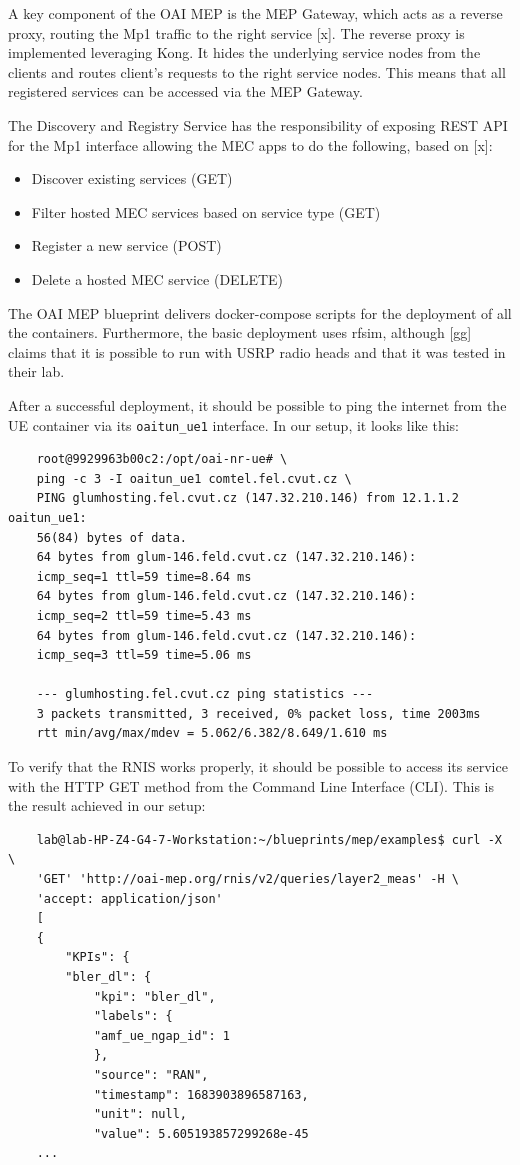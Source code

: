 \documentclass[12pt,a4paper,twoside]{report}
\begin{document}
A key component of the OAI MEP is the MEP Gateway, which acts as a reverse proxy, routing the Mp1 traffic to the right service [x]. The reverse proxy is implemented leveraging Kong. It hides the underlying service nodes from the clients and routes client’s requests to the right service nodes. This means that all registered services can be accessed via the MEP Gateway. 

The Discovery and Registry Service has the responsibility of exposing REST API for the Mp1 interface allowing the MEC apps to do the following, based on [x]:
\begin{itemize}
	\item Discover existing services (GET)
	\item Filter hosted MEC services based on service type (GET)
	\item Register a new service (POST)
	\item Delete a hosted MEC service (DELETE)
\end{itemize}
The OAI MEP blueprint delivers docker-compose scripts for the deployment of all the containers. Furthermore, the basic deployment uses rfsim, although [gg] claims that it is possible to run with USRP radio heads and that it was tested in their lab. 

After a successful deployment, it should be possible to ping the internet from the UE container via its \verb |oaitun_ue1| interface. In our setup, it looks like this:
\begin{verbatim}
	root@9929963b00c2:/opt/oai-nr-ue# \
	ping -c 3 -I oaitun_ue1 comtel.fel.cvut.cz \
	PING glumhosting.fel.cvut.cz (147.32.210.146) from 12.1.1.2 oaitun_ue1:
	56(84) bytes of data.
	64 bytes from glum-146.feld.cvut.cz (147.32.210.146):
	icmp_seq=1 ttl=59 time=8.64 ms
	64 bytes from glum-146.feld.cvut.cz (147.32.210.146):
	icmp_seq=2 ttl=59 time=5.43 ms
	64 bytes from glum-146.feld.cvut.cz (147.32.210.146):
	icmp_seq=3 ttl=59 time=5.06 ms

	--- glumhosting.fel.cvut.cz ping statistics ---
	3 packets transmitted, 3 received, 0% packet loss, time 2003ms
	rtt min/avg/max/mdev = 5.062/6.382/8.649/1.610 ms
\end{verbatim}

To verify that the RNIS works properly, it should be possible to access its service with the HTTP GET method from the Command Line Interface (CLI). This is the result achieved in our setup:
\begin{verbatim}
	lab@lab-HP-Z4-G4-7-Workstation:~/blueprints/mep/examples$ curl -X \
	'GET' 'http://oai-mep.org/rnis/v2/queries/layer2_meas' -H \
	'accept: application/json'
	[
	{
		"KPIs": {
		"bler_dl": {
			"kpi": "bler_dl",
			"labels": {
			"amf_ue_ngap_id": 1
			},
			"source": "RAN",
			"timestamp": 1683903896587163,
			"unit": null,
			"value": 5.605193857299268e-45
	...
\end{verbatim}
\end{document}

